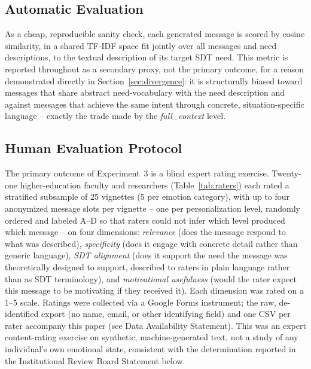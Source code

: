 \documentclass[higheredu,article,submit,pdftex,moreauthors]{Definitions/mdpi}
\begin{document}
\subsection{Automatic Evaluation}
\label{sec:automatic}

As a cheap, reproducible sanity check, each generated message is scored by cosine similarity, in a shared TF-IDF space fit jointly over all messages and need descriptions, to the textual description of its target SDT need. This metric is reported throughout as a secondary proxy, not the primary outcome, for a reason demonstrated directly in Section~\ref{sec:divergence}: it is structurally biased toward messages that share abstract need-vocabulary with the need description and against messages that achieve the same intent through concrete, situation-specific language -- exactly the trade made by the \textit{full\_context} level.

\subsection{Human Evaluation Protocol}
\label{sec:human}

The primary outcome of Experiment~3 is a blind expert rating exercise. Twenty-one higher-education faculty and researchers (Table~\ref{tab:raters}) each rated a stratified subsample of 25 vignettes (5 per emotion category), with up to four anonymized message slots per vignette -- one per personalization level, randomly ordered and labeled A--D so that raters could not infer which level produced which message -- on four dimensions: \textit{relevance} (does the message respond to what was described), \textit{specificity} (does it engage with concrete detail rather than generic language), \textit{SDT alignment} (does it support the need the message was theoretically designed to support, described to raters in plain language rather than as SDT terminology), and \textit{motivational usefulness} (would the rater expect this message to be motivating if they received it). Each dimension was rated on a 1--5 scale. Ratings were collected via a Google Forms instrument; the raw, de-identified export (no name, email, or other identifying field) and one CSV per rater accompany this paper (see Data Availability Statement). This was an expert content-rating exercise on synthetic, machine-generated text, not a study of any individual's own emotional state, consistent with the determination reported in the Institutional Review Board Statement below.
\end{document}
